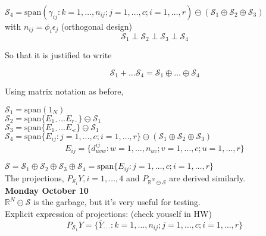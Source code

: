 \documentclass[11pt,fleqn]{book} %
\begin{document}
$\mathcal{S}_4 = \text{span}(\gamma_{ij}: k = 1, \dots, n_{ij}; j = 1, \dots, c; i = 1, \dots, r )\ominus (\mathcal{S}_1 \oplus \mathcal{S}_2 \oplus \mathcal{S}_3)$\\

with $n_{ij} = \phi_i \epsilon_j$ (orthogonal design)\\

		$$\mathcal{S}_1 \perp \mathcal{S}_2 \perp \mathcal{S}_3 \perp \mathcal{S}_4 $$

So that it is justified to write

		$$\mathcal{S}_1 + \dots \mathcal{S}_4 = \mathcal{S}_1 \oplus \dots \oplus \mathcal{S}_4$$

Using matrix notation as before, 


$\mathcal{S}_1 = \text{span}(1_N)$\\

$\mathcal{S}_2 = \text{span}\{E_{1\cdot} \dots E_{r \cdot}\} \ominus \mathcal{S}_1$\\

$\mathcal{S}_3 = \text{span}\{E_{1\cdot} \dots E_{ \cdot c}\} \ominus \mathcal{S}_1$\\

$\mathcal{S}_4 = \text{span}\{E_{ij}:j = 1, \dots, c; i = 1, \dots, r \} \ominus (\mathcal{S}_1 \oplus \mathcal{S}_2 \oplus \mathcal{S}_3)$\\


		$$E_{ij} = \{d^{ij}_{uvw}: w = 1, \dots, n_{uv}; v = 1, \dots, c; u = 1, \dots, r \} $$

$\mathcal{S} = \mathcal{S}_1 \oplus \mathcal{S}_2 \oplus \mathcal{S}_3 \oplus \mathcal{S}_4 = \text{span}\{E_{ij}:j = 1, \dots, c; i = 1, \dots, r\} $ \\


The projections, $P_{\mathcal{S}_i} Y, i = 1, \dots, 4$ and $P_{\mathbb{R}^N \ominus \mathcal{S}}$ are derived similarly. \\





\textbf{Monday October 10}\\

$\mathbb{R}^N \ominus \mathcal{S}$ is the garbage, but it's very useful for testing. \\


Explicit expression of projections: (check youself in HW)\\

		$$P_{\mathcal{S}_1} Y = \{\bar{Y}_{\cdot \cdot \cdot}:k = 1, \dots, n_{ij}; j = 1, \dots, c; i = 1, \dots, r \} $$
\end{document}
